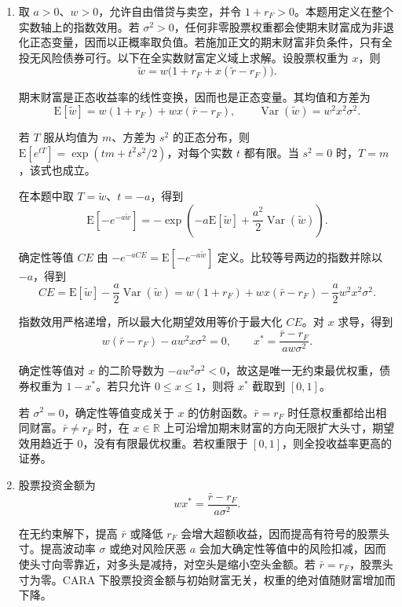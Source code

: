 \begin{solution}[blank-type=manual,blank-vsep=9\baselineskip]
\begin{enumerate}[label=(\alph*)]
\item 取 $a>0$、$w>0$，允许自由借贷与卖空，并令 $1+r_F>0$。本题用定义在整个实数轴上的指数效用。若 $\sigma^2>0$，任何非零股票权重都会使期末财富成为非退化正态变量，因而以正概率取负值。若施加正文的期末财富非负条件，只有全投无风险债券可行。以下在全实数财富定义域上求解。设股票权重为 $x$，则
\[
 \tilde w=w\bigl(1+r_F+x(\tilde r-r_F)\bigr).
\]

期末财富是正态收益率的线性变换，因而也是正态变量。其均值和方差为
\[
 \mathrm E[\tilde w]=w(1+r_F)+wx(\bar r-r_F),\qquad
 \operatorname{Var}(\tilde w)=w^2x^2\sigma^2.
\]

\begin{tcolorbox}[knowledge,title=正态分布的矩母函数]
若 $T$ 服从均值为 $m$、方差为 $s^2$ 的正态分布，则 $\mathrm E[e^{tT}]=\exp(tm+t^2s^2/2)$，对每个实数 $t$ 都有限。当 $s^2=0$ 时，$T=m$，该式也成立。
\end{tcolorbox}

在本题中取 $T=\tilde w$、$t=-a$，得到
\[
 \mathrm E[-e^{-a\tilde w}]
 =-\exp\left(-a\mathrm E[\tilde w]
              +\frac{a^2}{2}\operatorname{Var}(\tilde w)\right).
\]

确定性等值 $CE$ 由 $-e^{-aCE}=\mathrm E[-e^{-a\tilde w}]$ 定义。比较等号两边的指数并除以 $-a$，得到
\[
 CE=\mathrm E[\tilde w]-\frac a2\operatorname{Var}(\tilde w)
 =w(1+r_F)+wx(\bar r-r_F)-\frac a2w^2x^2\sigma^2.
\]

指数效用严格递增，所以最大化期望效用等价于最大化 $CE$。对 $x$ 求导，得到
\[
 w(\bar r-r_F)-aw^2x\sigma^2=0,
 \qquad x^*=\frac{\bar r-r_F}{aw\sigma^2}.
\]

确定性等值对 $x$ 的二阶导数为 $-aw^2\sigma^2<0$，故这是唯一无约束最优权重，债券权重为 $1-x^*$。若只允许 $0\le x\le1$，则将 $x^*$ 截取到 $[0,1]$。

若 $\sigma^2=0$，确定性等值变成关于 $x$ 的仿射函数。$\bar r=r_F$ 时任意权重都给出相同财富。$\bar r\ne r_F$ 时，在 $x\in\mathbb R$ 上可沿增加期末财富的方向无限扩大头寸，期望效用趋近于 $0$，没有有限最优权重。若权重限于 $[0,1]$，则全投收益率更高的证券。

\item 股票投资金额为
\[
 wx^*=\frac{\bar r-r_F}{a\sigma^2}.
\]

在无约束解下，提高 $\bar r$ 或降低 $r_F$ 会增大超额收益，因而提高有符号的股票头寸。提高波动率 $\sigma$ 或绝对风险厌恶 $a$ 会加大确定性等值中的风险扣减，因而使头寸向零靠近，对多头是减持，对空头是缩小空头金额。若 $\bar r=r_F$，股票头寸为零。CARA 下股票投资金额与初始财富无关，权重的绝对值随财富增加而下降。
\qedhere
\end{enumerate}
\end{solution}

